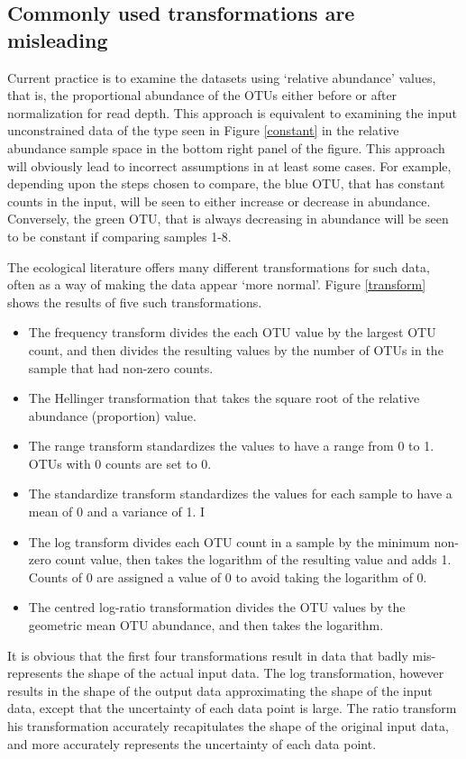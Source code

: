 \documentclass[11pt]{article}\usepackage[]{graphicx}\usepackage[]{color}
\begin{document}
\subsection{Commonly used transformations are misleading}
Current practice is to examine the datasets using `relative abundance' values, that is, the proportional abundance of the OTUs either before or after normalization for read depth. This approach is equivalent to examining the input unconstrained data of the type seen in Figure \ref{constant} in the relative abundance sample space in the bottom right panel of the figure. This approach will obviously lead to incorrect assumptions in at least some cases. For example, depending upon the steps chosen to compare, the blue OTU, that has constant counts in the input, will be seen to either increase or decrease in abundance. Conversely, the green OTU, that is always decreasing in abundance will be seen to be constant if comparing samples 1-8. 

The ecological literature offers many different transformations for such data, often as a way of making the data appear `more normal'. Figure  \ref{transform} shows the results of five such transformations. \begin{itemize}
\item The frequency transform divides the each OTU value by the largest OTU count, and then divides the resulting values by the number of OTUs in the sample that had non-zero counts. 
\item The Hellinger transformation that takes the square root of the relative abundance (proportion) value. 
\item The range transform standardizes the values to have a range from 0 to 1. OTUs with 0 counts are set to 0. 
\item The standardize transform standardizes the values for each sample to have a mean of 0 and a variance of 1. I
\item The log transform divides each OTU count in a sample by the minimum non-zero count value, then takes the logarithm of the resulting value and adds 1. Counts of 0 are assigned a value of 0 to avoid taking the logarithm of 0. 

\item The centred log-ratio transformation divides the OTU values by the geometric mean OTU abundance, and then takes the logarithm. 
\end{itemize}

It is obvious that the first four transformations result in data that badly mis-represents the shape of the actual input data. The log transformation, however results in the shape of the output data approximating the shape of the input data, except that the uncertainty of each data point is large. The ratio transform his transformation accurately recapitulates the shape of the original input data, and more accurately represents the uncertainty of each data point. 
\end{document}
